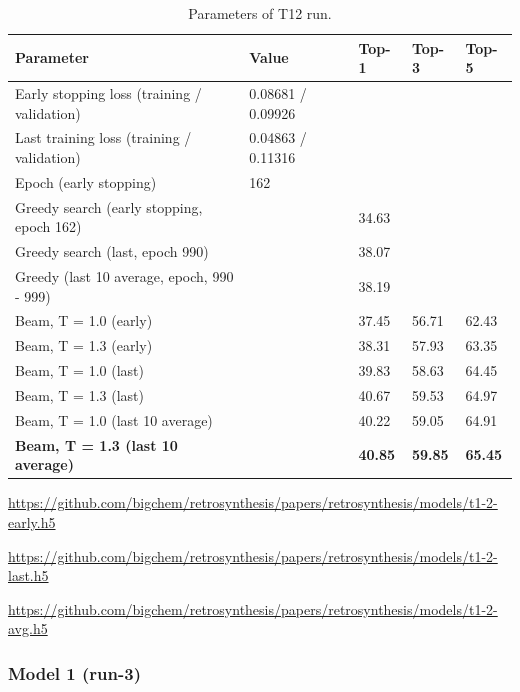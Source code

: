 \documentclass{article}
\begin{document}
\begin{table}[h!]
\caption{Parameters of T12 run.}
  \centering
  \begin{tabular}{p{6.2cm}p{3.5cm}p{1.5cm}p{1.5cm}p{1.5cm}}
    \toprule
    Parameter & Value & Top-1 & Top-3 & Top-5 \\
    \midrule
    Early stopping loss (training / validation) &  0.08681 / 0.09926 & & & \\
    Last training loss (training / validation) &  0.04863 / 0.11316  & & & \\
    Epoch (early stopping) & 162 & & & \\
    \midrule
    Greedy search (early stopping, epoch 162) &  & 34.63 & &\\
    Greedy search (last, epoch 990) &  & 38.07  & & \\
    Greedy (last 10 average, epoch, 990 - 999) & & 38.19 & & \\
    \midrule
    Beam, T = 1.0 (early) & & 37.45 & 56.71 & 62.43 \\
    Beam, T = 1.3 (early) & & 38.31 & 57.93 & 63.35 \\ 
    \midrule
    Beam, T = 1.0 (last) & & 39.83 & 58.63 &  64.45 \\
    Beam, T = 1.3 (last) & & 40.67 &  59.53 & 64.97 \\ 
    \midrule
    Beam, T = 1.0 (last 10 average) & & 40.22 & 59.05 &  64.91 \\
    \textbf{Beam, T = 1.3 (last 10 average)} & & \textbf{40.85} &  \textbf{59.85} & \textbf{65.45} \\ 
    \bottomrule
  \end{tabular}
  \label{tbl:t12}

\end{table} 

\url{https://github.com/bigchem/retrosynthesis/papers/retrosynthesis/models/t1-2-early.h5}

\url{https://github.com/bigchem/retrosynthesis/papers/retrosynthesis/models/t1-2-last.h5}

\url{https://github.com/bigchem/retrosynthesis/papers/retrosynthesis/models/t1-2-avg.h5}

\newpage

\subsubsection{Model 1 (run-3)}
  
\end{document}
